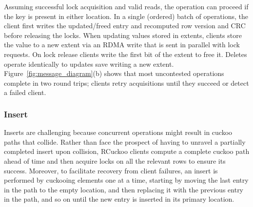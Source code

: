 Assuming successful lock acquisition and valid reads, the operation can proceed if the key is
present in either location.  In a single (ordered) batch of operations, the client first writes the
updated/freed entry and recomputed row version and CRC before releasing the locks. When updating
values stored in extents, clients store the value to a new extent via an RDMA write that is sent in
parallel with lock requests. On lock release clients write the first bit of the extent to free it.
Deletes operate identically to updates save writing a new extent.
Figure~\ref{fig:message_diagram}(b) shows that most uncontested operations complete in two round
trips; clients retry acquisitions until they succeed or detect a failed client.




\subsubsection{Insert}
\label{sec:insert}

Inserts are challenging because concurrent operations might result in
cuckoo paths that collide.  Rather than face the prospect of having to
unravel a partially completed insert upon collision, RCuckoo clients
compute a complete cuckoo path ahead of time and then acquire locks on
all the relevant rows to ensure its success.  Moreover, to facilitate
recovery from client failures, an insert is performed by cuckooing
elements one at a time, starting by moving the last entry in the path
to the empty location, and then replacing it with the previous
entry in the path, and so on until the new entry is inserted in its primary location.


